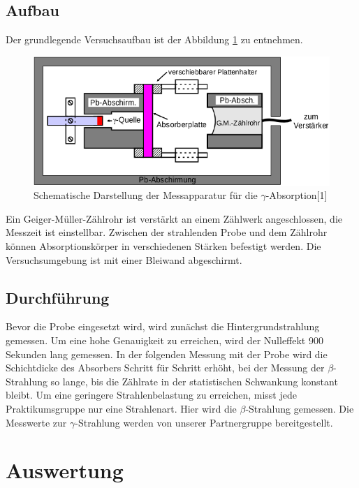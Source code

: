 \documentclass[11pt,ngerman,a4paper]{article}
\begin{document}
\subsection{Aufbau}
Der grundlegende Versuchsaufbau ist der Abbildung \ref{a4} zu entnehmen. 
\begin{figure}[htp]
\centering
\includegraphics[scale=0.7]{abb4.png}
\caption{Schematische Darstellung der Messapparatur für die $\gamma$-Absorption[1]}
\label{a4}
\end{figure}
Ein Geiger-Müller-Zählrohr ist verstärkt an einem Zählwerk angeschlossen, die Messzeit ist einstellbar. Zwischen der strahlenden Probe und dem Zählrohr können Absorptionskörper in verschiedenen Stärken befestigt werden. Die Versuchsumgebung ist mit einer Bleiwand abgeschirmt.
\subsection{Durchführung}
Bevor die Probe eingesetzt wird, wird zunächst die Hintergrundstrahlung gemessen. Um eine hohe Genauigkeit zu erreichen, wird der Nulleffekt 900 Sekunden lang gemessen. In der folgenden Messung mit der Probe wird die Schichtdicke des Absorbers Schritt für Schritt erhöht, bei der Messung der $\beta$-Strahlung so lange, bis die Zählrate in der statistischen Schwankung konstant bleibt.\newline
Um eine geringere Strahlenbelastung zu erreichen, misst jede Praktikumsgruppe nur eine Strahlenart. Hier wird die $\beta$-Strahlung gemessen. Die Messwerte zur $\gamma$-Strahlung werden von unserer Partnergruppe bereitgestellt.
\section{Auswertung}
\end{document}
